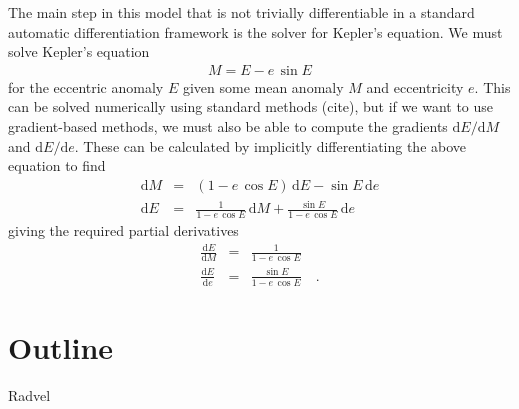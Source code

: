 \documentclass[modern]{aastex62}
\newcommand{\dd}{\ensuremath{ \mathrm{d}}}
\begin{document}
The main step in this model that is not trivially differentiable in a standard
automatic differentiation framework is the solver for Kepler's equation.
We must solve Kepler's equation
\begin{eqnarray}
M = E - e\,\sin E
\end{eqnarray}
for the eccentric anomaly $E$ given some mean anomaly $M$ and eccentricity
$e$.
This can be solved numerically using standard methods (cite), but if we want
to use gradient-based methods, we must also be able to compute the gradients
$\dd E / \dd M$ and $\dd E / \dd e$.
These can be calculated by implicitly differentiating the above equation to
find
\begin{eqnarray}
\dd M &=& (1 - e\,\cos E)\,\dd E - \sin E \, \dd e \\
\dd E &=& \frac{1}{1 - e\,\cos E}\,\dd M + \frac{\sin E}{1 - e\,\cos E}\,\dd e
\end{eqnarray}
giving the required partial derivatives
\begin{eqnarray}
\frac{\dd E}{\dd M} &=& \frac{1}{1 - e\,\cos E} \\
\frac{\dd E}{\dd e} &=& \frac{\sin E}{1 - e\,\cos E} \quad.
\end{eqnarray}

\section{Outline}

Radvel \citep{Fulton:2018}



\end{document}
